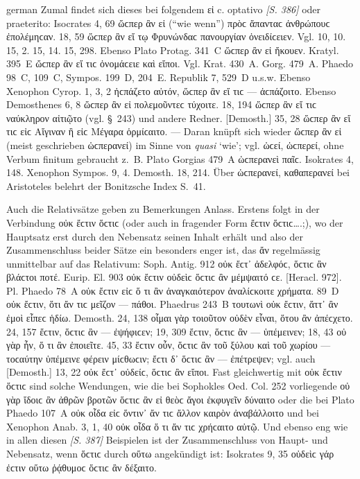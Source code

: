 \begin{otherlanguage*}{german}
Zumal findet sich dieses bei folgendem εἰ c. optativo \hypertarget{p386}{\emph{[S. 386]}}\label{p386} oder praeterito: Isocrates 4, 69 ὥϲπερ ἂν εἰ (“wie wenn”) πρὸϲ ἅπανταϲ ἀνθρώπουϲ ἐπολέμηϲαν. 18, 59 ὥϲπερ ἂν εἴ τῳ Φρυνώνδαϲ πανουργίαν ὀνειδίϲειεν. Vgl. 10, 10. 15, 2. 15, 14. 15, 298. Ebenso Plato Protag. 341~C ὥϲπερ ἂν εἰ ἤκουεν. Kratyl. 395~Ε ὤϲπερ ἂν εἴ τιϲ ὀνομάϲειε καὶ εἴποι. Vgl. Krat. 430~A. Gorg. 479~A. Phaedo 98~C, 109~C, Sympos. 199~D, 204~E. Republik 7, 529~D u.s.w. Ebenso Xenophon Cyrop. 1, 3, 2 ἠϲπάζετο αὐτόν, ὥϲπερ ἂν εἴ τιϲ — ἀϲπάζοιτο. Ebenso Demosthenes 6, 8 ὥϲπερ ἂν εἰ πολεμοῦντεϲ τύχοιτε. 18, 194 ὥϲπερ ἂν εἴ τιϲ ναύκληρον αἰτιῷτο (vgl. §~243) und andere Redner. [Demosth.] 35, 28 ὥϲπερ ἂν εἴ τιϲ εἰϲ Αἴγιναν ἢ εἰϲ Μέγαρα ὁρμίϲαιτο. — Daran knüpft sich wieder ὥϲπερ ἂν εἰ (meist geschrieben ὡϲπερανεί) im Sinne von \emph{quasi} ‘wie’; vgl. ὡϲεί, ὡϲπερεί, ohne Verbum finitum gebraucht z.~B. Plato Gorgias 479~A ὡϲπερανεὶ παῖϲ. Isokrates 4, 148. Xenophon Sympos. 9, 4. Demosth. 18, 214. Über ὡϲπερανεί, καθαπερανεί bei Aristoteles belehrt der Bonitzsche Index S.~41.

Auch die Relativsätze geben zu Bemerkungen Anlass. Erstens folgt in der Verbindung οὐκ ἔϲτιν ὅϲτιϲ (oder auch in fragender Form ἔϲτιν ὅϲτιϲ….;), wo der Hauptsatz erst durch den Nebensatz seinen Inhalt erhält und also der Zusammenschluss beider Sätze ein besonders enger ist, das ἄν regelmässig unmittelbar auf das Relativum: Soph. Antig. 912 οὐκ ἔϲτ᾽ ἀδελφόϲ, ὅϲτιϲ ἂν βλάϲτοι ποτέ. Eurip. El. 903 οὐκ ἔϲτιν οὐδεὶϲ ὅϲτιϲ ἂν μέμψαιτό ϲε. [Heracl. 972]. Pl. Phaedo 78~A οὐκ ἔϲτιν εἰϲ ὅ τι ἂν ἀναγκαιότερον ἀναλίϲκοιτε χρήματα. 89~D οὐκ ἔϲτιν, ὅτι ἄν τιϲ μεῖζον — πάθοι. Phaedrus 243~Β τουτωνὶ οὐκ ἔϲτιν, ἅττ᾽ ἂν ἐμοὶ εἶπεϲ ἡδίω. Demosth. 24, 138 οἶμαι γὰρ τοιοῦτον οὐδὲν εἶναι, ὅτου ἂν ἀπέϲχετο. 24, 157 ἔϲτιν, ὅϲτιϲ ἂν — ἐψήφιϲεν; 19, 309 ἔϲτιν, ὅϲτιϲ ἂν — ὑπέμεινεν; 18, 43 οὐ γὰρ ἦν, ὅ τι ἂν ἐποιεῖτε. 45, 33 ἔϲτιν οὖν, ὅϲτιϲ ἂν τοῦ ξύλου καὶ τοῦ χωρίου — τοϲαύτην ὑπέμεινε φέρειν μίϲθωϲιν; ἔϲτι δ᾽ ὅϲτιϲ ἂν — ἐπέτρεψεν; vgl. auch [Demosth.] 13, 22 οὐκ ἔϲτ᾽ οὐδείϲ, ὅϲτιϲ ἂν εἴποι. Fast gleichwertig mit οὐκ ἔϲτιν ὅϲτιϲ sind solche Wendungen, wie die bei Sophokles Oed. Col. 252 vorliegende οὐ γὰρ ἴδοιϲ ἂν ἀθρῶν βροτῶν ὅϲτιϲ ἂν εἰ θεὸϲ ἄγοι ἐκφυγεῖν δύναιτο oder die bei Plato Phaedo 107~Α οὐκ οἶδα εἰϲ ὅντιν᾽ ἄν τιϲ ἄλλον καιρὸν ἀναβάλλοιτο und bei Xenophon Anab. 3, 1, 40 οὐκ οἶδα ὅ τι ἄν τιϲ χρήϲαιτο αὐτῷ. Und ebenso eng wie in allen diesen \hypertarget{p387}{\emph{[S. 387]}}\label{p387} Beispielen ist der Zusammenschluss von Haupt- und Nebensatz, wenn ὅϲτιϲ durch οὕτω angekündigt ist: Isokrates 9, 35 οὐδεὶϲ γάρ ἐϲτιν οὕτω ῥᾴθυμοϲ ὅϲτιϲ ἂν δέξαιτο.


\end{otherlanguage*}
